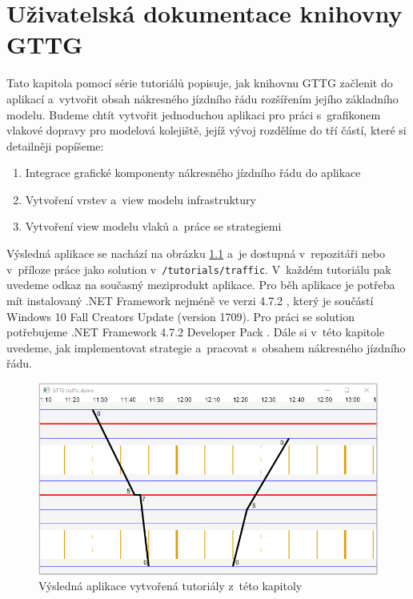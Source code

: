 \chapter{Uživatelská dokumentace knihovny GTTG}
Tato kapitola pomocí série tutoriálů popisuje, jak knihovnu GTTG začlenit do aplikací a~vytvořit obsah nákresného jízdního řádu rozšířením jejího základního modelu. Budeme chtít vytvořit jednoduchou aplikaci pro práci s~grafikonem vlakové dopravy pro modelová kolejiště, jejíž vývoj rozdělíme do tří částí, které si detailněji popíšeme:

\begin{enumerate}
	\item	Integrace grafické komponenty nákresného jízdního řádu do aplikace
	\item	Vytvoření vrstev a~view modelu infrastruktury
	\item	Vytvoření view modelu vlaků a~práce se strategiemi
\end{enumerate}

Výsledná aplikace se nachází na obrázku \ref{fig:kap5:demo_application} a~je dostupná v~repozitáři \cite{GTTG.Tutorials.Traffic} nebo v~příloze práce jako solution v~\texttt{/tutorials/traffic}. V~každém tutoriálu pak uvedeme odkaz na současný meziprodukt aplikace. Pro běh aplikace je potřeba mít instalovaný .NET Framework nejméně ve verzi 4.7.2 \cite{NET_framework4.7.2_run}, který je součástí Windows 10 Fall Creators Update (version 1709). Pro práci se solution potřebujeme .NET Framework 4.7.2 Developer Pack \cite{NET_framework4.7.2_dev}. Dále si v~této kapitole uvedeme, jak implementovat strategie a~pracovat s~obsahem nákresného jízdního řádu.

\begin{figure}[!hbt]
	\centering
	\includegraphics[width=\textwidth]{../img/kap5_gttg_traffic_demo}
	\caption{Výsledná aplikace vytvořená tutoriály z~této kapitoly}
	\label{fig:kap5:demo_application}
\end{figure}

